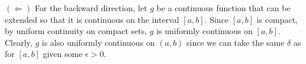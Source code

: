 $(\Leftarrow)$ For the backward direction, let $g$ be a continuous function
that can be extended so that it is continuous on the interval $[a, b]$.
Since $[a, b]$ is compact, by uniform continuity on compact sets,
$g$ is uniformly continuous on $[a, b]$.
Clearly, $g$ is also uniformly continuous on $(a, b)$
since we can take the same $\delta$ as for $[a, b]$ given some $\epsilon > 0$.
\bye
